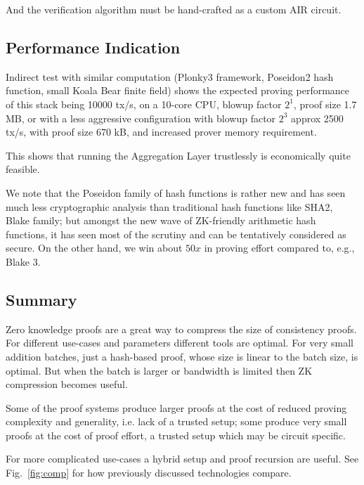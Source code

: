 \documentclass[twocolumn]{article}
\begin{document}
And the verification algorithm must be hand-crafted as a custom AIR circuit.

\subsection{Performance Indication}

Indirect test with similar computation (Plonky3 framework, Poseidon2 hash function, small Koala Bear finite field) shows the expected proving performance of this stack being 10000 tx/s, on a 10-core CPU, blowup factor $2^1$, proof size 1.7 MB, or with a less aggressive configuration with blowup factor $2^3$ approx 2500 tx/s, with proof size 670 kB, and increased prover memory requirement.

This shows that running the Aggregation Layer trustlessly is economically quite feasible.

We note that the Poseidon family of hash functions is rather new and has seen much less cryptographic analysis than traditional hash functions like SHA2, Blake family; but amongst the new wave of ZK-friendly arithmetic hash functions, it has seen most of the scrutiny and can be tentatively considered as secure. On the other hand, we win about $50x$ in proving effort compared to, e.g., Blake 3.


\subsection{Summary}

Zero knowledge proofs are a great way to compress the size of consistency proofs. For different use-cases and parameters different tools are optimal. For very small addition batches, just a hash-based proof, whose size is linear to the batch size, is optimal. But when the batch is larger or bandwidth is limited then ZK compression becomes useful.

Some of the proof systems produce larger proofs at the cost of reduced proving complexity and generality, i.e. lack of a trusted setup; some produce very small proofs at the cost of proof effort, a trusted setup which may be circuit specific.

For more complicated use-cases a hybrid setup and proof recursion are useful. See Fig.~\ref{fig:comp} for how previously discussed technologies compare.
\end{document}

